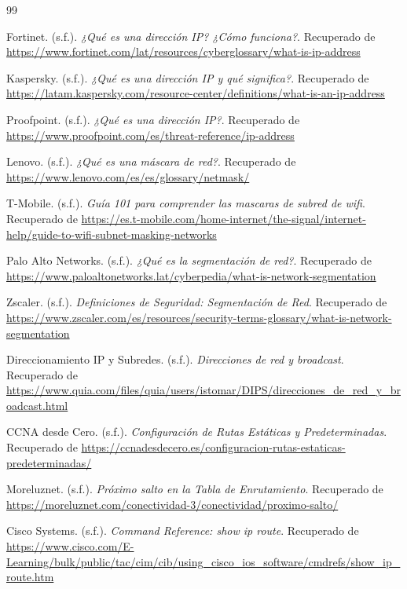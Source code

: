 \documentclass[a4paper,12pt]{article}
\begin{document}
\begin{thebibliography}{99}

    Fortinet. (s.f.). \textit{¿Qué es una dirección IP? ¿Cómo funciona?}. Recuperado de \url{https://www.fortinet.com/lat/resources/cyberglossary/what-is-ip-address}

    Kaspersky. (s.f.). \textit{¿Qué es una dirección IP y qué significa?}. Recuperado de \url{https://latam.kaspersky.com/resource-center/definitions/what-is-an-ip-address}

    Proofpoint. (s.f.). \textit{¿Qué es una dirección IP?}. Recuperado de \url{https://www.proofpoint.com/es/threat-reference/ip-address}

    Lenovo. (s.f.). \textit{¿Qué es una máscara de red?}. Recuperado de \url{https://www.lenovo.com/es/es/glossary/netmask/}

    T-Mobile. (s.f.). \textit{Guía 101 para comprender las mascaras de subred de wifi}. Recuperado de \url{https://es.t-mobile.com/home-internet/the-signal/internet-help/guide-to-wifi-subnet-masking-networks}

    Palo Alto Networks. (s.f.). \textit{¿Qué es la segmentación de red?}. Recuperado de \url{https://www.paloaltonetworks.lat/cyberpedia/what-is-network-segmentation}

    Zscaler. (s.f.). \textit{Definiciones de Seguridad: Segmentación de Red}. Recuperado de \url{https://www.zscaler.com/es/resources/security-terms-glossary/what-is-network-segmentation}

    Direccionamiento IP y Subredes. (s.f.). \textit{Direcciones de red y broadcast}. Recuperado de \url{https://www.quia.com/files/quia/users/istomar/DIPS/direcciones_de_red_y_broadcast.html}

    CCNA desde Cero. (s.f.). \textit{Configuración de Rutas Estáticas y Predeterminadas}. Recuperado de \url{https://ccnadesdecero.es/configuracion-rutas-estaticas-predeterminadas/}

    Moreluznet. (s.f.). \textit{Próximo salto en la Tabla de Enrutamiento}. Recuperado de \url{https://moreluznet.com/conectividad-3/conectividad/proximo-salto/}

    Cisco Systems. (s.f.). \textit{Command Reference: show ip route}. Recuperado de \url{https://www.cisco.com/E-Learning/bulk/public/tac/cim/cib/using_cisco_ios_software/cmdrefs/show_ip_route.htm}
    

\end{thebibliography}
\end{document}
